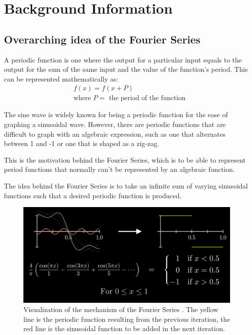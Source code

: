 \documentclass[letterpaper, 12pt]{article}
\begin{document}
\section{Background Information}

\subsection{Overarching idea of the Fourier Series}

A periodic function is one where the output for a particular input equals to
the output for the sum of the same input and the value of the function's period.
This can be represented mathematically as:
\begin{align*}
     & f(x) = f(x + P)
    \\
     & \text{where } P = \text{ the period of the function}
\end{align*}

The sine wave is widely known for being a periodic function for the ease of graphing
a sinusoidal wave. However, there are periodic functions that are difficult to
graph with an algebraic expression, such as one that alternates between
1 and -1 or one that is shaped as a zig-zag.

This is the motivation behind the Fourier Series, which is to be able to represent
period functions that normally can't be represented by an algebraic function.

The idea behind the Fourier Series is to take an infinite sum of varying sinusoidal
functions such that a desired periodic function is produced.

\begin{figure}[H]
    \centering
    \includegraphics[width=\textwidth]{fourier_basic_visual.png}
    \caption{Visualization of the mechanism of the Fourier Series \protect\cite{sandersonWhatFourierSeries2019}. The yellow line is the periodic function resulting from the previous iteration, the red line is the sinusoidal function to be added in the next iteration.}
    \label{fig:fourier_visual}
\end{figure}
\end{document}
